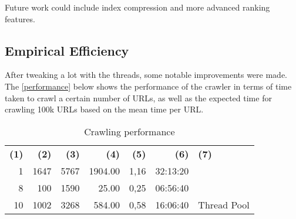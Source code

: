 Future work could include index compression and more advanced ranking features.

\subsection{Empirical Efficiency}

After tweaking a lot with the threads, some notable improvements were made. The \autoref{performance} below shows the performance of the crawler in terms of time taken to crawl a certain number of URLs, as well as the expected time for crawling 100k URLs based on the mean time per URL.

\begin{table}[!ht] \centering
  \caption{Crawling performance} \label{performance}
  \begin{tabular}{rrrrrrl}
    \textbf{(1)} & \textbf{(2)} & \textbf{(3)} & \textbf{(4)} & \textbf{(5)} & \textbf{(6)}      & \textbf{(7)}             \\
    1            & 1647         & 5767         & 1904.00      & 1,16         & 32:13:20          &                          \\
    8            & 100          & 1590         & 25.00        & 0,25         & 06:56:40          &                          \\
    10           & 1002         & 3268         & 584.00       & 0,58         & 16:06:40          & Thread Pool              \\

\end{tabular}
\end{table}
